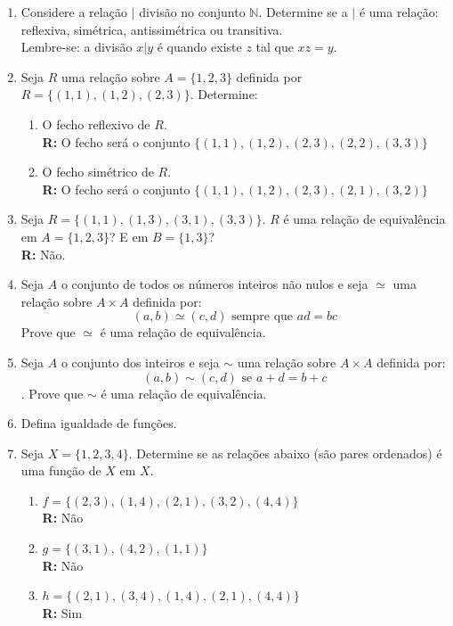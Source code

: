 \documentclass[oneside,a4paper,12pt]{article}
\begin{document}
\begin{enumerate}
	\item Considere a relação $|$ divisão no conjunto $\mathbb{N}$. Determine se a $|$ é uma relação: reflexiva, simétrica, antissimétrica ou transitiva. \\ Lembre-se: a divisão $x|y$ é quando existe $z$ tal que $xz=y$.
	
	\item Seja $R$ uma relação sobre $A = \{1,2,3\}$ definida por \\ $R = \{(1,1), (1,2), (2,3)\}$. Determine:
	\begin{enumerate}
		\item O fecho reflexivo de $R$. \\{\bf R:} O fecho será o conjunto $\{(1,1), (1,2), (2,3), (2,2), (3,3)\}$
		\item O fecho simétrico de $R$. \\ {\bf R:} O fecho será o conjunto $\{(1,1), (1,2), (2,3), (2,1), (3,2)\}$
	\end{enumerate}

	\item Seja $R = \{ (1,1), (1,3), (3,1), (3,3) \}$. $R$ é uma relação de equivalência em $A = \{1,2,3\}$? E em $B = \{1,3\}$?
	\\ {\bf R: }Não.
	
	\item Seja $A$ o conjunto de todos os números inteiros não nulos e seja $\simeq$ uma relação sobre $A \times A$ definida por: $$(a,b) \simeq (c,d) \text{ sempre que } ad=bc$$
	Prove que $\simeq$ é uma relação de equivalência.

	\item Seja $A$ o conjunto dos inteiros e seja $\sim$ uma relação sobre $A \times A$ definida por: $$(a,b) \sim (c,d) \text{ se } a + d = b + c$$.
	Prove que $\sim$ é uma relação de equivalência.
	
	\item Defina igualdade de funções.
	
	\item Seja $X = \{ 1,2,3,4\}$. Determine se as relações abaixo (são pares ordenados) é uma função de $X$ em $X$.
	\begin{enumerate}
		\item $f = \{ (2,3),(1,4), (2,1),(3,2),(4,4)\}$ \\ {\bf R:} Não
		\item $g = \{(3,1), (4,2),(1,1)\}$ \\ {\bf R:} Não
		\item $h = \{(2,1), (3,4), (1,4),(2,1),(4,4)\}$ \\ {\bf R: } Sim
	\end{enumerate}
	

\end{enumerate}
\end{document}
